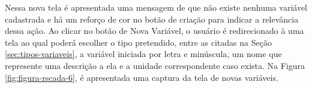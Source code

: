         \begin{figure}[!h]
    	\end{figure}
    	
    	\begin{figure}[!h]
    	\end{figure}

Nessa nova tela é apresentada uma mensagem de que não existe nenhuma variável cadastrada e há um reforço de cor no botão de criação para indicar a relevância dessa ação. Ao clicar no botão de Nova Variável, o usuário é redirecionado à uma tela ao qual poderá escolher o tipo pretendido, entre as citadas na Seção \ref{sec:tipos-variaveis}, a variável iniciada por letra e minúscula, um nome que represente uma descrição a ela e a unidade correspondente caso exista. Na Figura \ref{fig:figura-rscada-6}, é apresentada uma captura da tela de novas variáveis.

\newpage

        \begin{figure}[!h]
    	\end{figure}
    	
